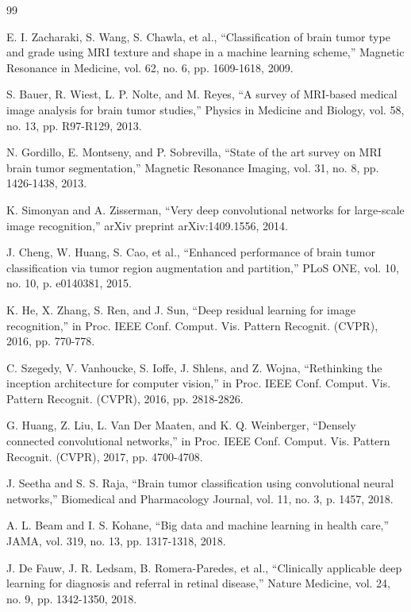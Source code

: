 \documentclass[final,3p,times,number]{elsarticle}
\begin{document}
\begin{thebibliography}{99}

 E. I. Zacharaki, S. Wang, S. Chawla, et al., ``Classification of brain tumor type and grade using MRI texture and shape in a machine learning scheme,'' Magnetic Resonance in Medicine, vol. 62, no. 6, pp. 1609-1618, 2009.

 S. Bauer, R. Wiest, L. P. Nolte, and M. Reyes, ``A survey of MRI-based medical image analysis for brain tumor studies,'' Physics in Medicine and Biology, vol. 58, no. 13, pp. R97-R129, 2013.

 N. Gordillo, E. Montseny, and P. Sobrevilla, ``State of the art survey on MRI brain tumor segmentation,'' Magnetic Resonance Imaging, vol. 31, no. 8, pp. 1426-1438, 2013.

 K. Simonyan and A. Zisserman, ``Very deep convolutional networks for large-scale image recognition,'' arXiv preprint arXiv:1409.1556, 2014.

 J. Cheng, W. Huang, S. Cao, et al., ``Enhanced performance of brain tumor classification via tumor region augmentation and partition,'' PLoS ONE, vol. 10, no. 10, p. e0140381, 2015.

 K. He, X. Zhang, S. Ren, and J. Sun, ``Deep residual learning for image recognition,'' in Proc. IEEE Conf. Comput. Vis. Pattern Recognit. (CVPR), 2016, pp. 770-778.

 C. Szegedy, V. Vanhoucke, S. Ioffe, J. Shlens, and Z. Wojna, ``Rethinking the inception architecture for computer vision,'' in Proc. IEEE Conf. Comput. Vis. Pattern Recognit. (CVPR), 2016, pp. 2818-2826.

 G. Huang, Z. Liu, L. Van Der Maaten, and K. Q. Weinberger, ``Densely connected convolutional networks,'' in Proc. IEEE Conf. Comput. Vis. Pattern Recognit. (CVPR), 2017, pp. 4700-4708.

 J. Seetha and S. S. Raja, ``Brain tumor classification using convolutional neural networks,'' Biomedical and Pharmacology Journal, vol. 11, no. 3, p. 1457, 2018.

 A. L. Beam and I. S. Kohane, ``Big data and machine learning in health care,'' JAMA, vol. 319, no. 13, pp. 1317-1318, 2018.

 J. De Fauw, J. R. Ledsam, B. Romera-Paredes, et al., ``Clinically applicable deep learning for diagnosis and referral in retinal disease,'' Nature Medicine, vol. 24, no. 9, pp. 1342-1350, 2018.


\end{thebibliography}
\end{document}
